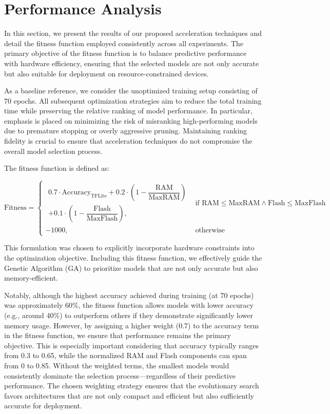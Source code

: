 \chapter{Performance Analysis}
\label{chap:performance_analysis}

In this section, we present the results of our proposed acceleration techniques and detail the fitness function employed consistently across all experiments. The primary objective of the fitness function is to balance predictive performance with hardware efficiency, ensuring that the selected models are not only accurate but also suitable for deployment on resource-constrained devices.

As a baseline reference, we consider the unoptimized training setup consisting of 70 epochs. All subsequent optimization strategies aim to reduce the total training time while preserving the relative ranking of model performance. In particular, emphasis is placed on minimizing the risk of misranking high-performing models due to premature stopping or overly aggressive pruning. Maintaining ranking fidelity is crucial to ensure that acceleration techniques do not compromise the overall model selection process.

The fitness function is defined as:

\sloppy
\begin{equation}
\text{Fitness} =
\begin{cases}
\begin{aligned}
0.7 \cdot \text{Accuracy}_{\text{TFLite}} 
+ 0.2 \cdot \left(1 - \dfrac{\text{RAM}}{\text{MaxRAM}}\right) \\
+ 0.1 \cdot \left(1 - \dfrac{\text{Flash}}{\text{MaxFlash}}\right),
\end{aligned}
& \text{if } \text{RAM} \leq \text{MaxRAM} \land \text{Flash} \leq \text{MaxFlash} \\
-1000, & \text{otherwise}
\end{cases}
\label{eq:fitness_function}
\end{equation}



This formulation was chosen to explicitly incorporate hardware constraints into the optimization objective. Including this fitness function, we effectively guide the Genetic Algorithm (GA) to prioritize models that are not only accurate but also memory-efficient.

Notably, although the highest accuracy achieved during training (at 70 epochs) was approximately 60\%, the fitness function allows models with lower accuracy (e.g., around 40\%) to outperform others if they demonstrate significantly lower memory usage. However, by assigning a higher weight (0.7) to the accuracy term in the fitness function, we ensure that performance remains the primary objective. This is especially important considering that accuracy typically ranges from 0.3 to 0.65, while the normalized RAM and Flash components can span from 0 to 0.85. Without the weighted terms, the smallest models would consistently dominate the selection process—regardless of their predictive performance. The chosen weighting strategy ensures that the evolutionary search favors architectures that are not only compact and efficient but also sufficiently accurate for deployment.

